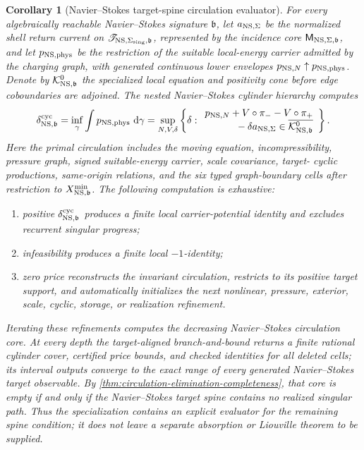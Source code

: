 \documentclass[11pt]{article}
\numberwithin{section}{part}
\theoremstyle{plain}
\newtheorem{corollary}[corollary]{Corollary}
\theoremstyle{definition}
\theoremstyle{remark}
\newcommand{\dd}{\,\mathrm d}
\newcommand{\Spine}{\mathscr T}
\newcommand{\Phys}{\mathrm{phys}}
\begin{document}
\begin{corollary}[Navier--Stokes target-spine circulation evaluator]
\label{cor:ns-target-spine-circulation-evaluator}
For every algebraically reachable Navier--Stokes signature \(\mathfrak b\), let
\(a_{{\rm NS},\Sigma}\) be the normalized shell return current on
\(\Spine_{{\rm NS},\Sigma_{\rm sing},\mathfrak b}\), represented by the
incidence core \(\mathsf M_{{\rm NS},\Sigma,\mathfrak b}\), and let
\(p_{{\rm NS},\Phys}\) be the restriction of the suitable local-energy
carrier admitted by the charging graph, with generated continuous lower
envelopes \(p_{{\rm NS},N}\uparrow p_{{\rm NS},\Phys}\).  Denote by
\(\mathcal K^{0}_{{\rm NS},\mathfrak b}\) the specialized local equation and
positivity cone before edge coboundaries are adjoined.  The nested
Navier--Stokes cylinder hierarchy computes
\begin{equation}
 \label{eq:ns-sharp-cycle-price}
 \delta_{{\rm NS},\mathfrak b}^{\rm cyc}
 =\inf_{\gamma}
   \int p_{{\rm NS},\Phys}\,\dd\gamma
 =\sup_{N,V,\delta}\left\{\delta:
 \begin{array}{l}
 p_{{\rm NS},N}+V\circ\pi_- -V\circ\pi_+\\
 \hfill{}-\delta a_{{\rm NS},\Sigma}
 \in\overline{\mathcal K^{0}_{{\rm NS},\mathfrak b}}
 \end{array}\right\}.
\end{equation}
Here the primal circulation includes the moving equation, incompressibility,
pressure graph, signed suitable-energy carrier, scale covariance, target-
cyclic productions, same-origin relations, and the six typed graph-boundary
cells after restriction to
\(X^{\min}_{{\rm NS},\mathfrak b}\).  The following computation is exhaustive:
\begin{enumerate}[label=\textup{(N\arabic*)}]
\item positive \(\delta_{{\rm NS},\mathfrak b}^{\rm cyc}\) produces a finite
local carrier-potential identity and excludes recurrent singular progress;
\item infeasibility produces a finite local \(-1\)-identity;
\item zero price reconstructs the invariant circulation, restricts to its
positive target support, and automatically initializes the next nonlinear,
pressure, exterior, scale, cyclic, storage, or realization refinement.
\end{enumerate}
Iterating these refinements computes the decreasing Navier--Stokes
circulation core.  At every depth the target-aligned branch-and-bound returns
a finite rational cylinder cover, certified price bounds, and checked
identities for all deleted cells; its interval outputs converge to the exact
range of every generated Navier--Stokes target observable.  By
\cref{thm:circulation-elimination-completeness}, that core is empty if and
only if the Navier--Stokes target spine contains no realized singular path.
Thus the specialization contains an explicit evaluator for the remaining
spine condition; it does not leave a separate absorption or Liouville theorem
to be supplied.
\end{corollary}
\end{document}
